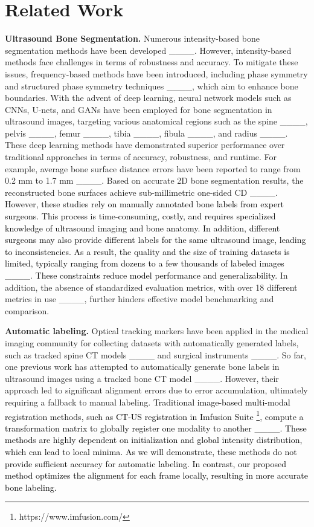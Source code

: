 \section{Related Work}
\label{Related Work}
\textbf{Ultrasound Bone Segmentation.} Numerous intensity-based bone segmentation methods have been developed ____. However, intensity-based methods face challenges in terms of robustness and accuracy. To mitigate these issues, frequency-based methods have been introduced, including phase symmetry and structured phase symmetry techniques ____, which aim to enhance bone boundaries. With the advent of deep learning, neural network models such as CNNs, U-nets, and GANs have been employed for bone segmentation in ultrasound images, targeting various anatomical regions such as the spine ____, pelvis ____, femur ____, tibia ____, fibula ____, and radius ____. These deep learning methods have demonstrated superior performance over traditional approaches in terms of accuracy, robustness, and runtime. For example, average bone surface distance errors have been reported to range from 0.2 mm to 1.7 mm ____. Based on accurate 2D bone segmentation results, the reconstructed bone surfaces achieve sub-millimetric one-sided CD ____. \textcolor{black}{However, these studies rely on manually annotated bone labels from expert surgeons. This process is time-consuming, costly, and requires specialized knowledge of ultrasound imaging and bone anatomy. In addition, different surgeons may also provide different labels for the same ultrasound image, leading to inconsistencies. As a result, the quality and the size of training datasets is limited, typically ranging from dozens to a few thousands of labeled images ____. These constraints reduce model performance and generalizability.} In addition, the absence of standardized evaluation metrics, with over 18 different metrics in use ____, further hinders effective model benchmarking and comparison. 

\textbf{Automatic labeling.} Optical tracking markers have been applied in the medical imaging community for collecting datasets with automatically generated labels, such as tracked spine CT models ____ and surgical instruments ____. So far, one previous work has attempted to automatically generate bone labels in ultrasound images using a tracked bone CT model ____. However, their approach led to significant alignment errors due to error accumulation, ultimately requiring a fallback to manual labeling. \textcolor{black}{Traditional image-based multi-modal registration methods, such as CT-US registration in Imfusion Suite \footnote{https://www.imfusion.com/}, compute a transformation matrix to globally register one modality to another ____. These methods are highly dependent on initialization and global intensity distribution, which can lead to local minima. As we will demonstrate, these methods do not provide sufficient accuracy for automatic labeling. In contrast, our proposed method optimizes the alignment for each frame locally, resulting in more accurate bone labeling.}



